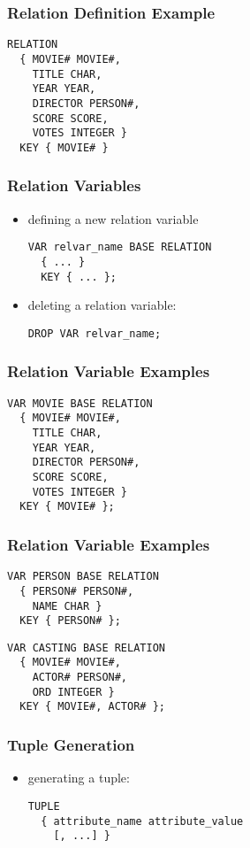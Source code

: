 \documentclass[dvipsnames]{beamer}
\theoremstyle{plain}
\begin{document}
\begin{frame}[fragile]
  \frametitle{Relation Definition Example}

  \begin{lstlisting}
RELATION
  { MOVIE# MOVIE#,
    TITLE CHAR,
    YEAR YEAR,
    DIRECTOR PERSON#,
    SCORE SCORE,
    VOTES INTEGER }
  KEY { MOVIE# }
  \end{lstlisting}
\end{frame}

\begin{frame}[fragile]
  \frametitle{Relation Variables}

  \begin{itemize}
    \item defining a new relation variable
    \begin{lstlisting}
VAR relvar_name BASE RELATION
  { ... }
  KEY { ... };
    \end{lstlisting}

    \item deleting a relation variable:
    \begin{lstlisting}
DROP VAR relvar_name;
    \end{lstlisting}
  \end{itemize}
\end{frame}

\begin{frame}[fragile]
  \frametitle{Relation Variable Examples}

  \begin{lstlisting}
VAR MOVIE BASE RELATION
  { MOVIE# MOVIE#,
    TITLE CHAR,
    YEAR YEAR,
    DIRECTOR PERSON#,
    SCORE SCORE,
    VOTES INTEGER }
  KEY { MOVIE# };
  \end{lstlisting}
\end{frame}

\begin{frame}[fragile]
  \frametitle{Relation Variable Examples}

  \begin{lstlisting}
VAR PERSON BASE RELATION
  { PERSON# PERSON#,
    NAME CHAR }
  KEY { PERSON# };
  \end{lstlisting}

  \begin{lstlisting}
VAR CASTING BASE RELATION
  { MOVIE# MOVIE#,
    ACTOR# PERSON#,
    ORD INTEGER }
  KEY { MOVIE#, ACTOR# };
  \end{lstlisting}
\end{frame}

\begin{frame}[fragile]
  \frametitle{Tuple Generation}

  \begin{itemize}
    \item generating a tuple:
    \begin{lstlisting}
TUPLE
  { attribute_name attribute_value
    [, ...] }
    \end{lstlisting}
  \end{itemize}
\end{frame}
\end{document}
